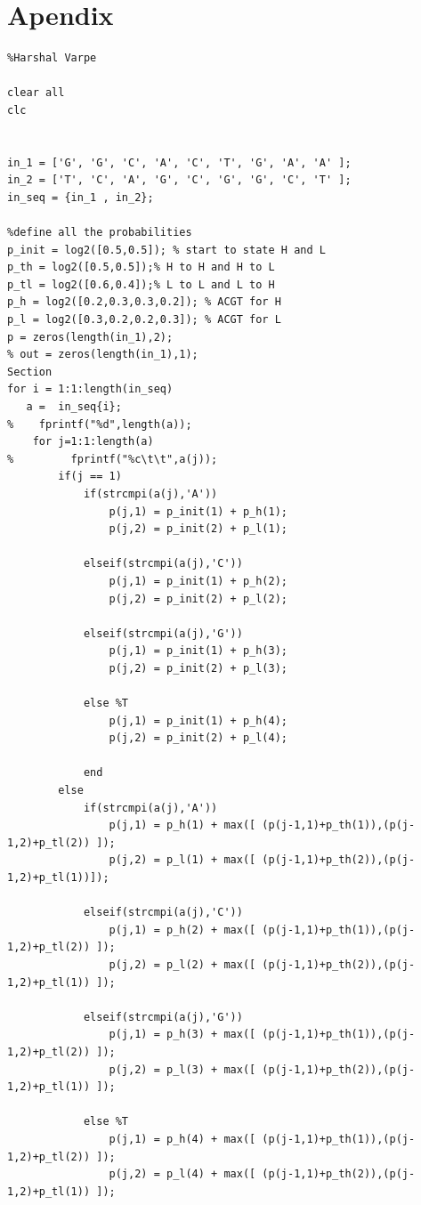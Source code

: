 \documentclass{article}
\begin{document}
\section{Apendix}\label{sec:apdx}
\begin{lstlisting}[frame=single]
%Lab 7 Viterbi Algorithm
%Harshal Varpe

clear all
clc


in_1 = ['G', 'G', 'C', 'A', 'C', 'T', 'G', 'A', 'A' ];
in_2 = ['T', 'C', 'A', 'G', 'C', 'G', 'G', 'C', 'T' ];
in_seq = {in_1 , in_2};

%define all the probabilities
p_init = log2([0.5,0.5]); % start to state H and L
p_th = log2([0.5,0.5]);% H to H and H to L
p_tl = log2([0.6,0.4]);% L to L and L to H
p_h = log2([0.2,0.3,0.3,0.2]); % ACGT for H
p_l = log2([0.3,0.2,0.2,0.3]); % ACGT for L
p = zeros(length(in_1),2);
% out = zeros(length(in_1),1);
Section
for i = 1:1:length(in_seq)
   a =  in_seq{i};
%    fprintf("%d",length(a));
    for j=1:1:length(a)
%         fprintf("%c\t\t",a(j));
        if(j == 1)
            if(strcmpi(a(j),'A'))
                p(j,1) = p_init(1) + p_h(1);
                p(j,2) = p_init(2) + p_l(1);
                
            elseif(strcmpi(a(j),'C'))
                p(j,1) = p_init(1) + p_h(2);
                p(j,2) = p_init(2) + p_l(2);
                
            elseif(strcmpi(a(j),'G'))
                p(j,1) = p_init(1) + p_h(3);
                p(j,2) = p_init(2) + p_l(3);
                
            else %T
                p(j,1) = p_init(1) + p_h(4);
                p(j,2) = p_init(2) + p_l(4);
                
            end
        else
            if(strcmpi(a(j),'A'))
                p(j,1) = p_h(1) + max([ (p(j-1,1)+p_th(1)),(p(j-1,2)+p_tl(2)) ]);
                p(j,2) = p_l(1) + max([ (p(j-1,1)+p_th(2)),(p(j-1,2)+p_tl(1))]);
                
            elseif(strcmpi(a(j),'C'))
                p(j,1) = p_h(2) + max([ (p(j-1,1)+p_th(1)),(p(j-1,2)+p_tl(2)) ]);
                p(j,2) = p_l(2) + max([ (p(j-1,1)+p_th(2)),(p(j-1,2)+p_tl(1)) ]);
                
            elseif(strcmpi(a(j),'G'))
                p(j,1) = p_h(3) + max([ (p(j-1,1)+p_th(1)),(p(j-1,2)+p_tl(2)) ]);
                p(j,2) = p_l(3) + max([ (p(j-1,1)+p_th(2)),(p(j-1,2)+p_tl(1)) ]);
                
            else %T
                p(j,1) = p_h(4) + max([ (p(j-1,1)+p_th(1)),(p(j-1,2)+p_tl(2)) ]);
                p(j,2) = p_l(4) + max([ (p(j-1,1)+p_th(2)),(p(j-1,2)+p_tl(1)) ]);
                

\end{lstlisting}
\end{document}
